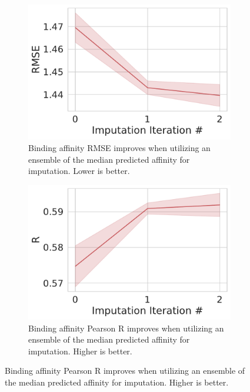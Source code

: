 \documentclass[journal=jmcmar,manuscript=article]{achemso}
\begin{document}
\begin{figure}[tbph]
    \centering
    \begin{subfigure}[t]{0.48\textwidth}
        \centering
        \includegraphics[width=\linewidth]{figures/MedGOEnsRMSE.pdf}
        \caption{Binding affinity RMSE improves when utilizing an ensemble of the median predicted affinity for imputation. Lower is better.}
    \end{subfigure}
    \hfill
    \begin{subfigure}[t]{0.48\textwidth}
        \centering
        \includegraphics[width=\linewidth]{figures/MedGOEnsR.pdf}
        \caption{Binding affinity Pearson R improves when utilizing an ensemble of the median predicted affinity for imputation. Higher is better.}
    \end{subfigure}


\end{figure}
\end{document}
